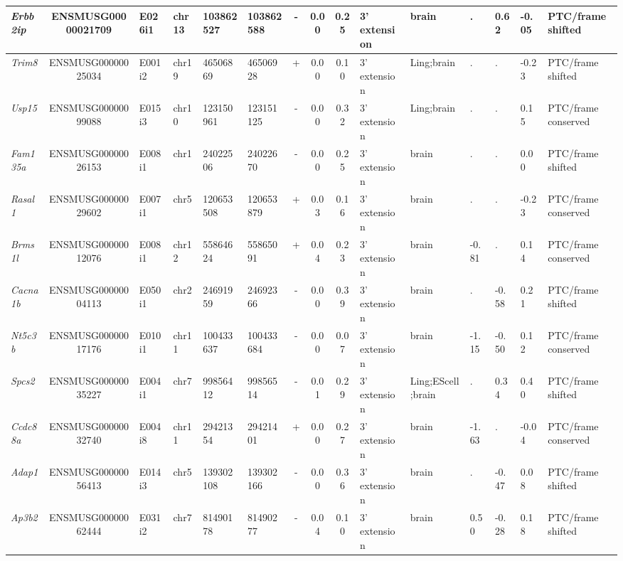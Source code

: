 \begin{landscape}
\begin{table}[htbp]
{\begin{tabular}{|l|c|l|l|l|l|c|c|c|l|l|l|l|l|l|}
		\textit{Erbb2ip} & ENSMUSG00000021709 & E026i1 & chr13 & 103862527 & 103862588 & -     & 0.00  & 0.25  & 3' extension & brain & .     & 0.62  & -0.05 & PTC/frame shifted \\ \hline
		\textit{Trim8} & ENSMUSG00000025034 & E001i2 & chr19 & 46506869 & 46506928 & +     & 0.00  & 0.10  & 3' extension & Ling;brain & .     & .     & -0.23 & PTC/frame shifted \\ \hline
		\textit{Usp15} & ENSMUSG00000099088 & E015i3 & chr10 & 123150961 & 123151125 & -     & 0.00  & 0.32  & 3' extension & Ling;brain & .     & .     & 0.15  & PTC/frame conserved \\ \hline
		\textit{Fam135a} & ENSMUSG00000026153 & E008i1 & chr1  & 24022506 & 24022670 & -     & 0.00  & 0.25  & 3' extension & brain & .     & .     & 0.00  & PTC/frame shifted \\ \hline
		\textit{Rasal1} & ENSMUSG00000029602 & E007i1 & chr5  & 120653508 & 120653879 & +     & 0.03  & 0.16  & 3' extension & brain & .     & .     & -0.23 & PTC/frame conserved \\ \hline
		\textit{Brms1l} & ENSMUSG00000012076 & E008i1 & chr12 & 55864624 & 55865091 & +     & 0.04  & 0.23  & 3' extension & brain & -0.81 & .     & 0.14  & PTC/frame conserved \\ \hline
		\textit{Cacna1b} & ENSMUSG00000004113 & E050i1 & chr2  & 24691959 & 24692366 & -     & 0.00  & 0.39  & 3' extension & brain & .     & -0.58 & 0.21  & PTC/frame shifted \\ \hline
		\textit{Nt5c3b} & ENSMUSG00000017176 & E010i1 & chr11 & 100433637 & 100433684 & -     & 0.00  & 0.07  & 3' extension & brain & -1.15 & -0.50 & 0.12  & PTC/frame conserved \\ \hline
		\textit{Spcs2} & ENSMUSG00000035227 & E004i1 & chr7  & 99856412 & 99856514 & -     & 0.01  & 0.29  & 3' extension & Ling;EScell;brain & .     & 0.34  & 0.40  & PTC/frame shifted \\ \hline
		\textit{Ccdc88a} & ENSMUSG00000032740 & E004i8 & chr11 & 29421354 & 29421401 & +     & 0.00  & 0.27  & 3' extension & brain & -1.63 & .     & -0.04 & PTC/frame conserved \\ \hline
		\textit{Adap1} & ENSMUSG00000056413 & E014i3 & chr5  & 139302108 & 139302166 & -     & 0.00  & 0.36  & 3' extension & brain & .     & -0.47 & 0.08  & PTC/frame shifted \\ \hline
		\textit{Ap3b2} & ENSMUSG00000062444 & E031i2 & chr7  & 81490178 & 81490277 & -     & 0.04  & 0.10  & 3' extension & brain & 0.50  & -0.28 & 0.18  & PTC/frame shifted \\ \hline

\end{tabular}}
\end{table}
\end{landscape}
